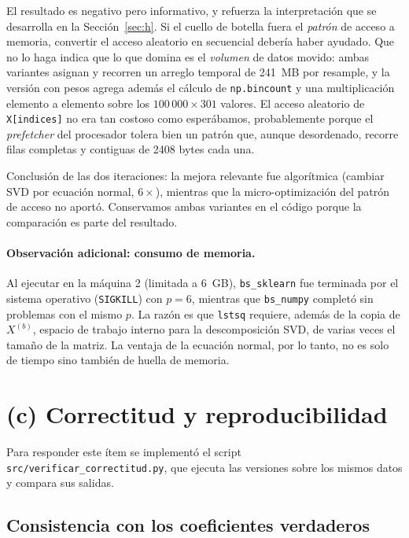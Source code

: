 \documentclass[11pt,letterpaper]{article}
\begin{document}
El resultado es negativo pero informativo, y refuerza la interpretación que se desarrolla
en la Sección~\ref{sec:h}. Si el cuello de botella fuera el \emph{patrón} de acceso a
memoria, convertir el acceso aleatorio en secuencial debería haber ayudado. Que no lo
haga indica que lo que domina es el \emph{volumen} de datos movido: ambas variantes
asignan y recorren un arreglo temporal de 241~MB por resample, y la versión con pesos
agrega además el cálculo de \texttt{np.bincount} y una multiplicación elemento a elemento
sobre los $100\,000 \times 301$ valores. El acceso aleatorio de \texttt{X[indices]} no era
tan costoso como esperábamos, probablemente porque el \textit{prefetcher} del procesador
tolera bien un patrón que, aunque desordenado, recorre filas completas y contiguas de
2408 bytes cada una.

Conclusión de las dos iteraciones: la mejora relevante fue algorítmica (cambiar SVD por
ecuación normal, $6\times$), mientras que la micro-optimización del patrón de acceso no
aportó. Conservamos ambas variantes en el código porque la comparación es parte del
resultado.

\paragraph{Observación adicional: consumo de memoria.}
Al ejecutar en la máquina 2 (limitada a 6~GB), \texttt{bs\_sklearn} fue terminada por
el sistema operativo (\texttt{SIGKILL}) con $p = 6$, mientras que \texttt{bs\_numpy}
completó sin problemas con el mismo $p$. La razón es que \texttt{lstsq} requiere, además
de la copia de $X^{(b)}$, espacio de trabajo interno para la descomposición SVD, de
varias veces el tamaño de la matriz. La ventaja de la ecuación normal, por lo tanto, no
es solo de tiempo sino también de huella de memoria.

\section{(c) Correctitud y reproducibilidad}
\label{sec:c}

Para responder este ítem se implementó el script \texttt{src/verificar\_correctitud.py},
que ejecuta las versiones sobre los mismos datos y compara sus salidas.

\subsection{Consistencia con los coeficientes verdaderos}
\end{document}
